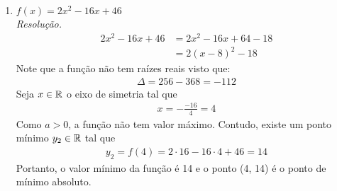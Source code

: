\begin{enumerate}
    \item $f(x) = 2x^2 - 16x + 46$ \\
    \emph{Resolução.}
    \begin{align*}
        2x^2 - 16x + 46 &= 2x^2 - 16x + 64 - 18 \\ 
        &= 2(x-8)^2 - 18
    \end{align*}
    Note que a função não tem raízes reais visto que:
    \begin{align*}
        \Delta = 256 - 368 = -112
    \end{align*}
    Seja $x \in \mathbb R$ o eixo de simetria tal que
    \begin{align*}
        x = -\frac{-16}{4} = 4
    \end{align*}
    Como $a > 0$, a função não tem valor máximo. Contudo, existe um ponto mínimo $y_2 \in \mathbb R$ tal que
    \begin{align*}
        y_2 = f(4) = 2 \cdot 16 - 16 \cdot 4 + 46 = 14 
    \end{align*}
    Portanto, o valor mínimo da função é 14 e o ponto (4, 14) é o ponto de mínimo absoluto.
\end{enumerate}